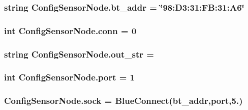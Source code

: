 \subsubsection[{\texorpdfstring{bt\+\_\+addr}{bt_addr}}]{\setlength{\rightskip}{0pt plus 5cm}string Config\+Sensor\+Node.\+bt\+\_\+addr = \char`\"{}98\+:D3\+:31\+:\+F\+B\+:31\+:\+A6\char`\"{}}\hypertarget{namespaceConfigSensorNode_a2a256a51aae354ee6485d21cb86cb2fd}{}\label{namespaceConfigSensorNode_a2a256a51aae354ee6485d21cb86cb2fd}
\subsubsection[{\texorpdfstring{conn}{conn}}]{\setlength{\rightskip}{0pt plus 5cm}int Config\+Sensor\+Node.\+conn = 0}\hypertarget{namespaceConfigSensorNode_af6cc4bdac63d1aa1101a09a1b0397dff}{}\label{namespaceConfigSensorNode_af6cc4bdac63d1aa1101a09a1b0397dff}
\subsubsection[{\texorpdfstring{out\+\_\+str}{out_str}}]{\setlength{\rightskip}{0pt plus 5cm}string Config\+Sensor\+Node.\+out\+\_\+str = \textquotesingle{}\textquotesingle{}}\hypertarget{namespaceConfigSensorNode_a342daf0f5ba11071cd0705f1c2b0b039}{}\label{namespaceConfigSensorNode_a342daf0f5ba11071cd0705f1c2b0b039}
\subsubsection[{\texorpdfstring{port}{port}}]{\setlength{\rightskip}{0pt plus 5cm}int Config\+Sensor\+Node.\+port = 1}\hypertarget{namespaceConfigSensorNode_a5982a85097d3c75e147cab5f9c788eda}{}\label{namespaceConfigSensorNode_a5982a85097d3c75e147cab5f9c788eda}
\subsubsection[{\texorpdfstring{sock}{sock}}]{\setlength{\rightskip}{0pt plus 5cm}Config\+Sensor\+Node.\+sock = Blue\+Connect({\bf bt\+\_\+addr},{\bf port},5.)}\hypertarget{namespaceConfigSensorNode_a355f029c49f6fbfc56463a4276debbb9}{}\label{namespaceConfigSensorNode_a355f029c49f6fbfc56463a4276debbb9}
